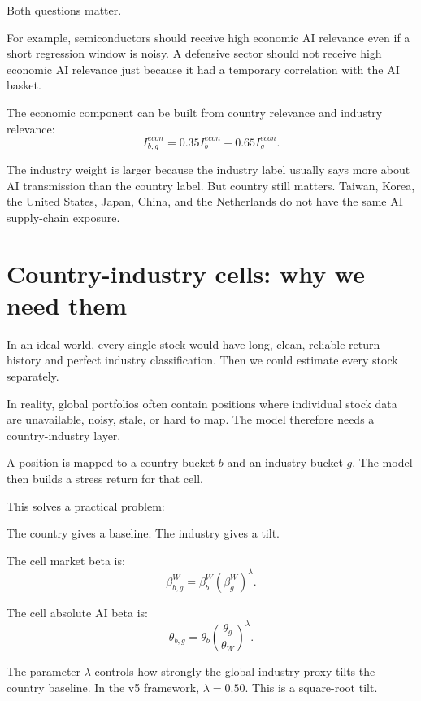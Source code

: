 \documentclass[10pt]{article}
\begin{document}
Both questions matter.

For example, semiconductors should receive high economic AI relevance even if a short regression window is noisy. A defensive sector should not receive high economic AI relevance just because it had a temporary correlation with the AI basket.

The economic component can be built from country relevance and industry relevance:
\[
I_{b,g}^{econ}=0.35I_b^{econ}+0.65I_g^{econ}.
\]

The industry weight is larger because the industry label usually says more about AI transmission than the country label. But country still matters. Taiwan, Korea, the United States, Japan, China, and the Netherlands do not have the same AI supply-chain exposure.

\section{Country-industry cells: why we need them}

In an ideal world, every single stock would have long, clean, reliable return history and perfect industry classification. Then we could estimate every stock separately.

In reality, global portfolios often contain positions where individual stock data are unavailable, noisy, stale, or hard to map. The model therefore needs a country-industry layer.

A position is mapped to a country bucket $b$ and an industry bucket $g$. The model then builds a stress return for that cell.

This solves a practical problem:

\begin{center}
\end{center}

The country gives a baseline. The industry gives a tilt.

The cell market beta is:
\[
\beta_{b,g}^{W}=\beta_b^W(\beta_g^W)^{\lambda}.
\]

The cell absolute AI beta is:
\[
\theta_{b,g}=\theta_b\left(\frac{\theta_g}{\theta_W}\right)^{\lambda}.
\]

The parameter $\lambda$ controls how strongly the global industry proxy tilts the country baseline. In the v5 framework, $\lambda=0.50$. This is a square-root tilt.
\end{document}
